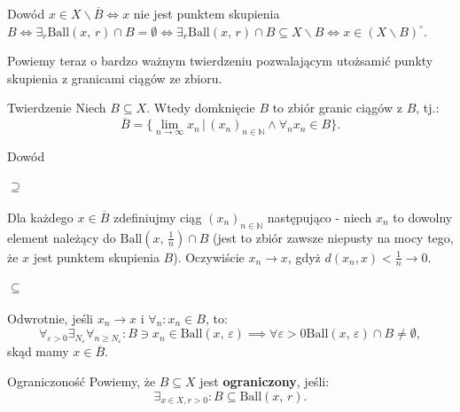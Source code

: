 \documentclass{article}
\newcommand{\N}{\mathbb{N}}
\newcommand{\oo}{\infty}
\newcommand{\eps}{\varepsilon}
\newcommand{\dg}{^{\circ}}
\newcommand{\ciag}[1]{(#1_{n})_{n \in \N}}
\newcommand{\ball}[2]{\text{Ball}(#1, \, #2)}
\begin{document}
    \begin{dow}{Dowód}
        $x \in X \backslash \overline{B} \iff x$ nie jest punktem skupienia $B \iff \exists_r \ball{x}{r} \cap B = \emptyset \iff \exists_r \ball{x}{r} \cap B \subseteq X \backslash B \iff x \in (X \backslash B) \dg$. 
    \end{dow}


    Powiemy teraz o bardzo ważnym twierdzeniu pozwalającym utożsamić punkty skupienia z granicami ciągów ze zbioru.
    \begin{twier}{Twierdzenie}
        Niech $B \subseteq X$. Wtedy domknięcie $B$ to zbiór granic ciągów z $B$, tj.: \begin{equation}
            \overline{B} = \{ \lim_{n\to \oo} x_n \,  \big| \, \ciag{x} \wedge \forall_n x_n \in B \}. 
        \end{equation}
    \end{twier}

    \begin{dow}{Dowód}
        \paragraph{$\supseteq$} Dla każdego $x \in \overline{B}$ zdefiniujmy ciąg $\ciag{x}$ następująco - niech $x_n$ to dowolny element należący do $\ball{x}{\frac{1}{n}} \cap B$ (jest to zbiór zawsze niepusty na mocy tego, że $x$ jest punktem skupienia $B$). Oczywiście $ x_n \to x$, gdyż $d(x_n, x) < \frac{1}{n} \to 0$.
        \paragraph{$\subseteq$} Odwrotnie, jeśli $x_n \to x$ i $\forall_n : x_n \in B$, to: \begin{equation}
            \forall_{\eps > 0} \exists_{N_\eps} \forall_{n \geqslant N_\eps}: B \ni x_n \in \ball{x}{\eps} \implies \forall{\eps >0} \ball{x}{\eps} \cap B \neq \emptyset,
        \end{equation} skąd mamy $x \in \overline{B}$.
    \end{dow}

    \begin{defr}{Ograniczoność}
        Powiemy, że $B \subseteq X$ jest \textbf{ograniczony}, jeśli: \begin{equation}
            \exists_{x \in X, r >0}: B \subseteq \ball{x}{r}.
        \end{equation}
    \end{defr}
\end{document}
